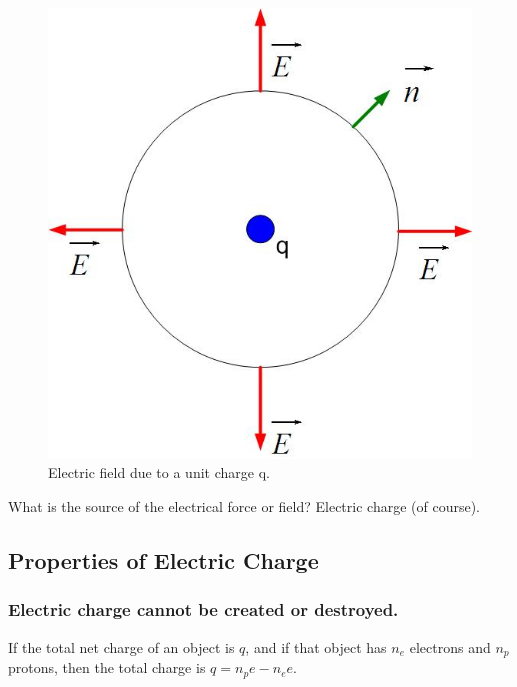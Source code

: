 \documentclass{ximera}
\begin{document}
\begin{figure}[htbp]
\begin{center}
\includegraphics[scale=0.5]{../jpg/unitchargefield.jpg}
\end{center}
\caption{Electric field due to a unit charge q.}
\label{UnitCh}
\end{figure}





What is the source of the electrical force or field? Electric charge (of course). 

\subsection{Properties of Electric Charge}

\subsubsection{Electric charge cannot be created or destroyed.} 

If the total net charge of an object is $q$, and if that object has $n_e$ electrons and $n_p$ protons, then the total charge is $q=n_p e-n_e e$. 

\end{document}
